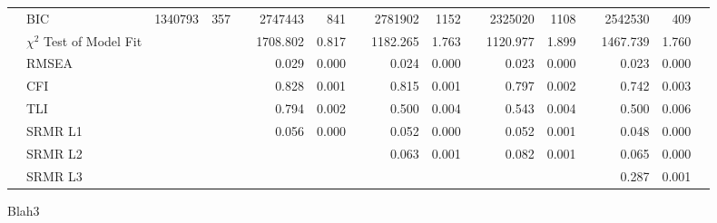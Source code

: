 {\begin{tabular}{l @{\hskip -8.1cm} l @{\hskip -0.1cm} rr l rr l rr l rr l rr l}
              & BIC   & 1340793 & 357   &       & 2747443 & 841   &       & 2781902 & 1152  &       & 2325020 & 1108  &       & 2542530 & 409   &  \\
              & $\chi^2$ Test of Model Fit &       &       &       & 1708.802 & 0.817 &       & 1182.265 & 1.763 &       & 1120.977 & 1.899 &       & 1467.739 & 1.760 &  \\
              & RMSEA &       &       &       & 0.029 & 0.000 &       & 0.024 & 0.000 &       & 0.023 & 0.000 &       & 0.023 & 0.000 &  \\
              & CFI   &       &       &       & 0.828 & 0.001 &       & 0.815 & 0.001 &       & 0.797 & 0.002 &       & 0.742 & 0.003 &  \\
              & TLI   &       &       &       & 0.794 & 0.002 &       & 0.500 & 0.004 &       & 0.543 & 0.004 &       & 0.500 & 0.006 &  \\
              & SRMR L1 &       &       &       & 0.056 & 0.000 &       & 0.052 & 0.000 &       & 0.052 & 0.001 &       & 0.048 & 0.000 &  \\
              & SRMR L2 &       &       &       &       &       &       & 0.063 & 0.001 &       & 0.082 & 0.001 &       & 0.065 & 0.000 &  \\
              & SRMR L3 &       &       &       &       &       &       &       &       &       &       &       &       & 0.287 & 0.001 &  \\
        \bottomrule
    \end{tabular}
}{Blah}{3}
